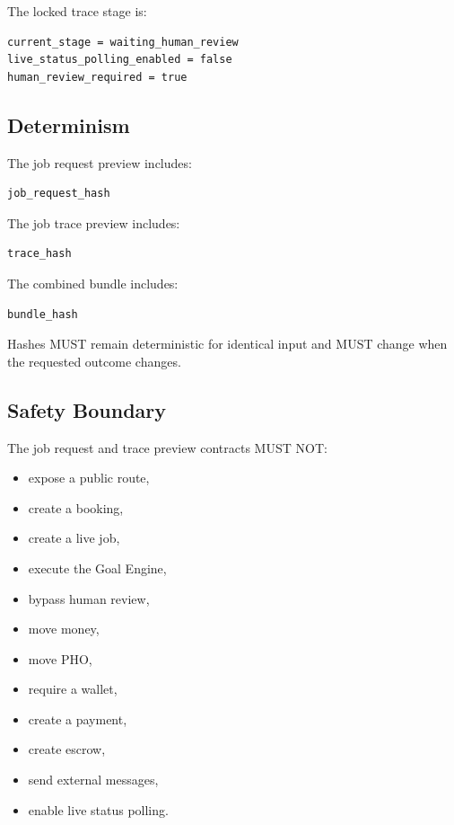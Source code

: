 The locked trace stage is:

\begin{verbatim}
current_stage = waiting_human_review
live_status_polling_enabled = false
human_review_required = true
\end{verbatim}

\subsection{Determinism}

The job request preview includes:

\begin{verbatim}
job_request_hash
\end{verbatim}

The job trace preview includes:

\begin{verbatim}
trace_hash
\end{verbatim}

The combined bundle includes:

\begin{verbatim}
bundle_hash
\end{verbatim}

Hashes MUST remain deterministic for identical input and MUST change when the requested outcome changes.

\subsection{Safety Boundary}

The job request and trace preview contracts MUST NOT:

\begin{itemize}
  \item expose a public route,
  \item create a booking,
  \item create a live job,
  \item execute the Goal Engine,
  \item bypass human review,
  \item move money,
  \item move PHO,
  \item require a wallet,
  \item create a payment,
  \item create escrow,
  \item send external messages,
  \item enable live status polling.
\end{itemize}


